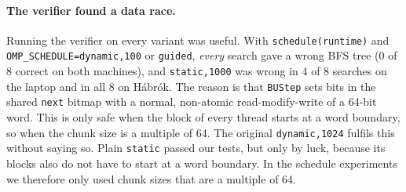 \paragraph{The verifier found a data race.} Running the verifier on every variant was useful.
With \texttt{schedule(runtime)} and \texttt{OMP\_SCHEDULE=dynamic,100} or \texttt{guided},
\emph{every} search gave a wrong BFS tree (0 of 8 correct on both machines), and
\texttt{static,1000} was wrong in 4 of 8 searches on the laptop and in all 8 on Hábrók. The
reason is that \texttt{BUStep} sets bits in the shared \texttt{next} bitmap with a normal,
non-atomic read-modify-write of a 64-bit word. This is only safe when the block of every
thread starts at a word boundary, so when the chunk size is a multiple of 64. The original
\texttt{dynamic,1024} fulfils this without saying so. Plain \texttt{static} passed our tests,
but only by luck, because its blocks also do not have to start at a word boundary. In the
schedule experiments we therefore only used chunk sizes that are a multiple of 64.
